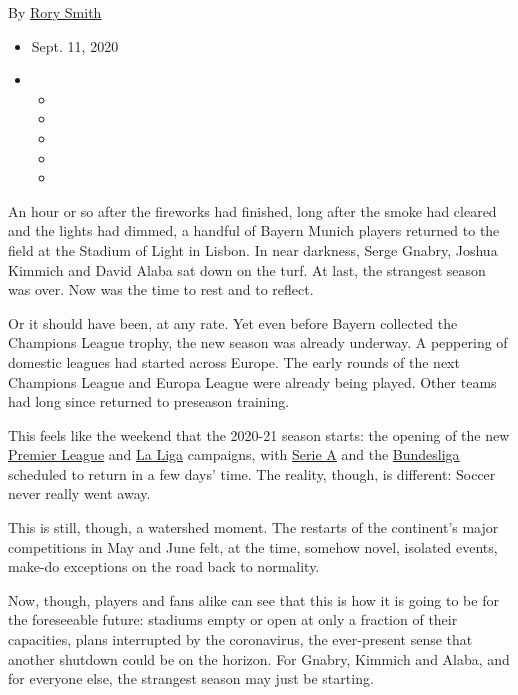 By \href{https://www.nytimes3xbfgragh.onion/by/rory-smith}{Rory Smith}

\begin{itemize}
\item
  Sept. 11, 2020
\item
  \begin{itemize}
  \item
  \item
  \item
  \item
  \item
  \end{itemize}
\end{itemize}

An hour or so after the fireworks had finished, long after the smoke had
cleared and the lights had dimmed, a handful of Bayern Munich players
returned to the field at the Stadium of Light in Lisbon. In near
darkness, Serge Gnabry, Joshua Kimmich and David Alaba sat down on the
turf. At last, the strangest season was over. Now was the time to rest
and to reflect.

Or it should have been, at any rate. Yet even before Bayern collected
the Champions League trophy, the new season was already underway. A
peppering of domestic leagues had started across Europe. The early
rounds of the next Champions League and Europa League were already being
played. Other teams had long since returned to preseason training.

This feels like the weekend that the 2020-21 season starts: the opening
of the new \href{https://www.premierleague.com/}{Premier League} and
\href{https://www.laliga.com/en-GB/laliga-santander/results}{La Liga}
campaigns, with
\href{http://www.legaseriea.it/en/serie-a/fixture-and-results}{Serie A}
and the
\href{https://www.bundesliga.com/en/bundesliga/matchday}{Bundesliga}
scheduled to return in a few days' time. The reality, though, is
different: Soccer never really went away.

This is still, though, a watershed moment. The restarts of the
continent's major competitions in May and June felt, at the time,
somehow novel, isolated events, make-do exceptions on the road back to
normality.

Now, though, players and fans alike can see that this is how it is going
to be for the foreseeable future: stadiums empty or open at only a
fraction of their capacities, plans interrupted by the coronavirus, the
ever-present sense that another shutdown could be on the horizon. For
Gnabry, Kimmich and Alaba, and for everyone else, the strangest season
may just be starting.

